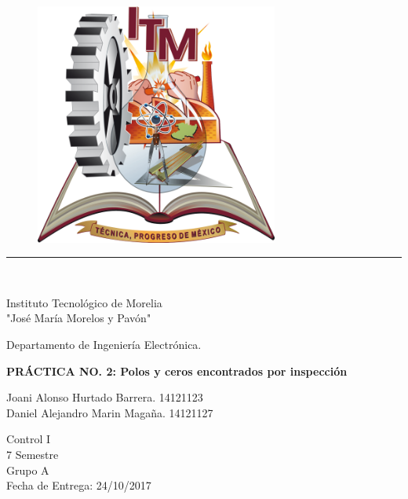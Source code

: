 \documentclass{report}
\newcounter{ns}
\begin{document}
	\begin{titlepage}
		\begin{center}
			\vspace*{0in}
			\begin{figure}[htb]
				\begin{center}
					\includegraphics[width=8cm]{0}
				\end{center}
			\end{figure}
			\rule{80mm}{0.1mm}\\
			\vspace*{0.1in}
			\begin{Large}
				Instituto Tecnológico de Morelia\\
				"José María Morelos y Pavón"\\
			\end{Large}
			\vspace*{0.15in}
			\begin{Large}
				Departamento de Ingeniería Electrónica.\\
			\end{Large}
			\vspace*{0.4in}
			\begin{Large}
				\textbf{PRÁCTICA NO. 2: Polos y ceros encontrados por inspección} \\
				\end{Large}
			\vspace*{0.3in}
			\begin{Large}
				Joani Alonso Hurtado Barrera. 14121123\\
				Daniel Alejandro Marin Magaña. 14121127\\
			\end{Large}
			\vspace*{0.1in}
			\begin{Large}
				Control I\\
				7 Semestre\\
				Grupo A\\
				Fecha de Entrega: 24/10/2017\\
			\end{Large}
		\end{center}		
	\end{titlepage}
\end{document}
